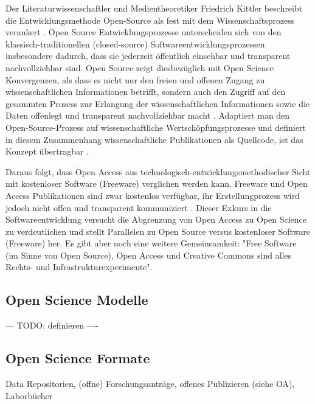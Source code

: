 Der Literaturwissenschaftler und Medientheoretiker Friedrich Kittler beschreibt die Entwicklungsmethode Open-Source als fest mit dem Wissenschaftsprozess verankert \cite{suchen}. Open Source Entwicklungsprozesse unterscheiden sich von den klassisch-traditionellen (closed-source) Softwareentwicklungsprozessen insbesondere dadurch, dass sie jederzeit öffentlich einsehbar und transparent nachvollziehbar sind. Open Source zeigt diesbezüglich mit Open Science Konvergenzen, als dass es nicht nur den freien und offenen Zugang zu wissenschaftlichen Informationen betrifft, sondern auch den Zugriff auf den gesammten Prozess zur Erlangung der wissenschaftlichen Informationen sowie die Daten offenlegt und transparent nachvollziehbar macht \cite{kelty_2004}. Adaptiert man den Open-Source-Prozess auf wissenschaftliche Wertschöpfungsprozesse und definiert in diesem Zusammenhang wissenschaftliche Publikationen als Quellcode, ist das Konzept übertragbar \cite{Singh_2008} \cite{Bradley_2008} \cite{Bradley_2007}. 

Daraus folgt, dass Open Access aus technologisch-entwicklungsmethodischer Sicht mit kostenloser Software (Freeware) \cite{suchen} verglichen werden kann. Freeware und Open Access Publikationen sind zwar kostenlos verfügbar, ihr Erstellungprozess wird jedoch nicht offen und transparent kommuniziert \cite{suchen}. Dieser Exkurs in die Softwareentwicklung versucht die Abgrenzung von Open Access zu Open Science zu verdeutlichen und stellt Parallelen zu Open Source versus kostenloser Software (Freeware) her. Es gibt aber noch eine  weitere Gemeinsamkeit: "Free Software (im Sinne von Open Source), Open Access und Creative Commons sind alles Rechts- und Infrastrukturexperimente"\cite{kelty_2004}.

\subsection{Open Science Modelle}
--- TODO: definieren ----
\subsection{Open Science Formate}
Data Repositorien, (offne) Forschungsanträge, offenes Publizieren (siehe OA), Laborbücher



